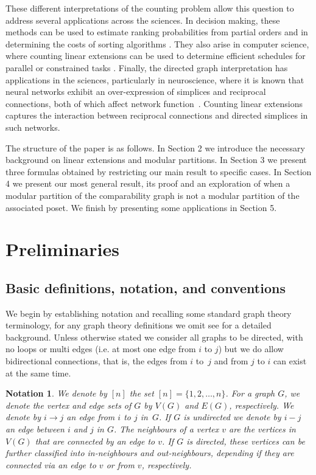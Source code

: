 \documentclass[9pt,a4paper,oneside]{article}
\newtheorem{notation}[theorem]{Notation}
\begin{document}
These different interpretations of the counting problem allow this question to address several applications across the sciences.
In decision making, these methods can be used to estimate ranking probabilities from partial orders \cite{lerche2003evaluation} and in determining the costs of sorting algorithms \cite{schonhage1976production}.
They also arise in computer science, where counting linear extensions can be used to determine efficient schedules for parallel or constrained tasks \cite{cato1995parallel,crampton2004algebraic}.
Finally, the directed graph interpretation has applications in the sciences, particularly in neuroscience, where it is known that neural networks exhibit an over-expression of simplices and reciprocal connections, both of which affect network function~\cite{sizemore2018cliques, tadic2019functional, sizemore2019importance, andjelkovic2020topology, shi2021computing, ecker2024cortical, santander2025heterogeneous}. Counting linear extensions captures the interaction between reciprocal connections and directed simplices in such networks.

The structure of the paper is as follows.  In Section 2 we introduce the necessary background on linear extensions and modular partitions. In Section 3 we present three formulas obtained by restricting our main result to specific cases. In Section 4 we present our most general result, its proof and an exploration of when a modular partition of the comparability graph is not a modular partition of the associated poset. We finish by presenting some applications in Section 5.

\section{Preliminaries}
\subsection{Basic definitions, notation, and conventions}

We begin by establishing notation and recalling some standard graph theory terminology, for any graph theory definitions we omit see \cite{Die12} for a detailed background.
Unless otherwise stated we consider all graphs to be directed, with no loops or multi edges (i.e. at most one edge from $i$ to $j$) but we do allow bidirectional connections, that is, the edges from $i$ to~$j$ and from $j$ to $i$ can exist at the same time.

\begin{notation}
We denote by $[n]$ the set $[n]=\{1,2,\ldots, n\}$.
For a graph $G$, we denote the vertex and edge sets of $G$ by $V(G)$ and $E(G)$, respectively.
We denote by $i\to j$ an edge from $i$ to $j$ in~$G$. 
If $G$ is undirected we denote by $i- j$ an edge between $i$ and $j$ in $G$. 
The \emph{neighbours} of a vertex $v$ are the vertices in $V(G)$ that are connected by an edge to $v$.  
If $G$ is directed, these vertices can be further classified into \emph{in-neighbours} and \emph{out-neighbours}, depending if they are connected via an edge to $v$ or from $v$, respectively.
\end{notation}
\end{document}
